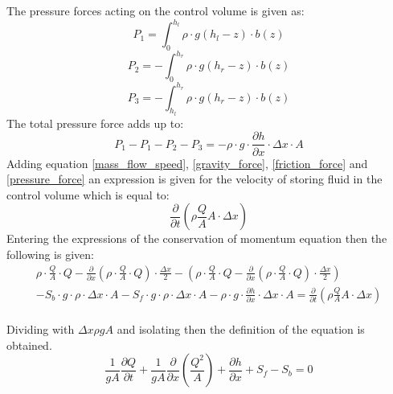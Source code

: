 The pressure forces acting on the control volume is given as:
\begin{equation}
	P_1 = \int_{0}^{h_l} \rho \cdot g (h_l - z)\cdot b(z)
\end{equation}
\begin{equation}
	P_2 = -\int_{0}^{h_r} \rho \cdot g (h_r - z)\cdot b(z)
\end{equation}
\begin{equation}
	P_3 = -\int_{h_l}^{h_r} \rho \cdot g (h_r - z)\cdot b(z)
\end{equation}
The total pressure force adds up to:
\begin{equation}
P_1 - P_1 -P_2 - P_3 = -\rho\cdot g \cdot \frac{\partial h}{\partial x} \cdot \Delta x \cdot A  
\label{pressure_force}
\end{equation}
Adding equation \ref{mass_flow_speed}, \ref{gravity_force}, \ref{friction_force} and \ref{pressure_force} an expression is given for the velocity of storing fluid in the control volume which is equal to:
\begin{equation}
\frac{\partial}{\partial t} (\rho \frac{Q}{A}A\cdot \Delta x)
\end{equation}
Entering the expressions of the conservation of momentum equation then the following is given:
\\
\begin{equation}
\begin{array}{l}
\rho \cdot \frac{Q}{A} \cdot Q - \frac{\partial}{\partial x}(\rho \cdot \frac{Q}{A}  \cdot Q) \cdot \frac{\Delta x}{2} - \left(\rho \cdot \frac{Q}{A}  \cdot Q - \frac{\partial}{\partial x}(\rho \cdot \frac{Q}{A}  \cdot Q) \cdot \frac{\Delta x}{2} \right)\\
-S_b \cdot g \cdot \rho \cdot \Delta x \cdot A -S_f \cdot g \cdot \rho \cdot \Delta x \cdot A  -\rho\cdot g \cdot \frac{\partial h}{\partial x} \cdot \Delta x \cdot A =\frac{\partial}{\partial t} (\rho \frac{Q}{A}A\cdot \Delta x)
\end{array}
\end{equation}
\\
Dividing with $\Delta x \rho g A$ and isolating then the definition of the equation is obtained.
\\
\begin{equation}
\frac{1}{gA} \frac{\partial Q}{\partial t} +\frac{1}{gA}\frac{\partial}{\partial x} \left( \frac{Q^2}{A} \right) + \frac{\partial h}{\partial x} + S_f - S_b = 0
\label{saintbernard_momentum}
\end{equation}
\\


